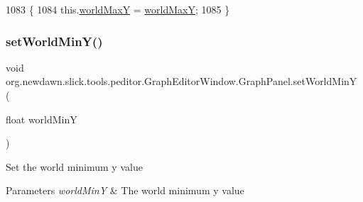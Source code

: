 \begin{DoxyCode}
1083                                                   \{
1084             this.\mbox{\hyperlink{classorg_1_1newdawn_1_1slick_1_1tools_1_1peditor_1_1_graph_editor_window_1_1_graph_panel_a9b7733b23535ca22b1cbdb029587dcfe}{worldMaxY}} = \mbox{\hyperlink{classorg_1_1newdawn_1_1slick_1_1tools_1_1peditor_1_1_graph_editor_window_1_1_graph_panel_a9b7733b23535ca22b1cbdb029587dcfe}{worldMaxY}};
1085         \}
\end{DoxyCode}
\mbox{\label{classorg_1_1newdawn_1_1slick_1_1tools_1_1peditor_1_1_graph_editor_window_1_1_graph_panel_a4a9e8b8ae38adde66836193fa9f12a8a}} 
\subsubsection{\texorpdfstring{set\+World\+Min\+Y()}{setWorldMinY()}}
{\footnotesize\ttfamily void org.\+newdawn.\+slick.\+tools.\+peditor.\+Graph\+Editor\+Window.\+Graph\+Panel.\+set\+World\+MinY (\begin{DoxyParamCaption}\item[{float}]{world\+MinY }\end{DoxyParamCaption})\hspace{0.3cm}{\ttfamily [inline]}}

Set the world minimum y value


\begin{DoxyParams}{Parameters}
{\em world\+MinY} & The world minimum y value \\
\hline
\end{DoxyParams}

